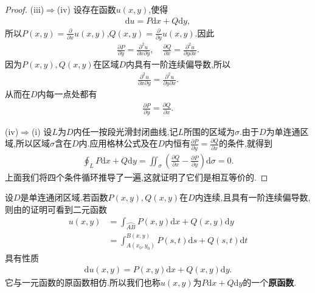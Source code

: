 \documentclass[../../main.tex]{subfiles}%
\begin{document}
\begin{proof}
(iii)$\Rightarrow$(iv) 设存在函数$u(x,y)$,使得
\begin{align*}
\mathrm{d}u = P\mathrm{d}x + Q\mathrm{d}y,
\end{align*}
所以$P(x,y) = \frac{\partial}{\partial x} u(x,y)$,$Q(x,y) = \frac{\partial}{\partial y} u(x,y)$.因此
\begin{align*}
\frac{\partial P}{\partial y} = \frac{\partial^2 u}{\partial x \partial y},\quad \frac{\partial Q}{\partial x} = \frac{\partial^2 u}{\partial y \partial x}.
\end{align*}
因为$P(x,y),Q(x,y)$在区域$D$内具有一阶连续偏导数,所以
\begin{align*}
\frac{\partial^2 u}{\partial x \partial y} = \frac{\partial^2 u}{\partial y \partial x}.
\end{align*}
从而在$D$内每一点处都有
\begin{align*}
\frac{\partial P}{\partial y} = \frac{\partial Q}{\partial x}.
\end{align*}

(iv)$\Rightarrow$(i) 设$L$为$D$内任一按段光滑封闭曲线,记$L$所围的区域为$\sigma$.由于$D$为单连通区域,所以区域$\sigma$含在$D$内.应用格林公式及在$D$内恒有$\frac{\partial P}{\partial y} = \frac{\partial Q}{\partial x}$的条件,就得到
\begin{align*}
\oint_L P\mathrm{d}x + Q\mathrm{d}y = \iint_{\sigma} \left( \frac{\partial Q}{\partial x} - \frac{\partial P}{\partial y} \right) \mathrm{d}\sigma = 0.
\end{align*}
上面我们将四个条件循环推导了一遍,这就证明了它们是相互等价的.


\end{proof}

\begin{definition}
设$D$是单连通闭区域.若函数$P(x,y),Q(x,y)$在$D$内连续,且具有一阶连续偏导数,则由的证明可看到二元函数
\begin{align*}
u(x,y) &= \int_{\wideparen{AB}} P(x,y)\mathrm{d}x + Q(x,y)\mathrm{d}y \\
&= \int_{A(x_0,y_0)}^{B(x,y)} P(s,t)\mathrm{d}s + Q(s,t)\mathrm{d}t
\end{align*}
具有性质
\begin{align*}
\mathrm{d}u(x,y) = P(x,y)\mathrm{d}x + Q(x,y)\mathrm{d}y.
\end{align*}
它与一元函数的原函数相仿.所以我们也称$u(x,y)$为$P\mathrm{d}x+Q\mathrm{d}y$的一个\textbf{原函数}.
\end{definition}
\end{document}
